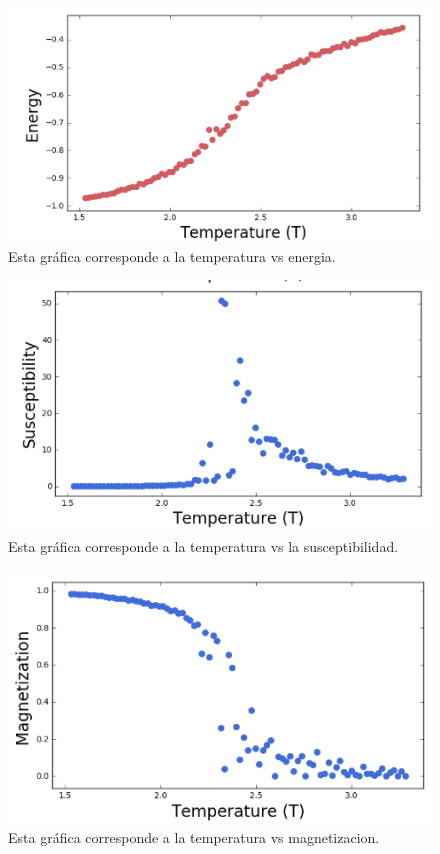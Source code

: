 \documentclass[letterpaper,12pt,oneside]{book}
\begin{document}
%
%
\begin{figure}
\centering
\includegraphics[scale=0.75]{fig/temperaturaVsEnergia.png}
\caption{\label{tempVsEnerg}  Esta gr\'afica corresponde a la temperatura vs energia.}
\end{figure}
% 
%
\begin{figure}
\centering
\includegraphics[scale=0.75]{fig/temperaturaVSSusceptibilidad.png}
\caption{\label{tempVsMag}  Esta gr\'afica corresponde a la temperatura vs la susceptibilidad.}
\end{figure}
% 
%
\begin{figure}
\centering
\includegraphics[scale=0.75]{fig/temperaturaVsMagnetizacion.png}
\caption{\label{tempVsSuc}  Esta gr\'afica corresponde a la temperatura vs magnetizacion.}
\end{figure}
% 
\end{document}
